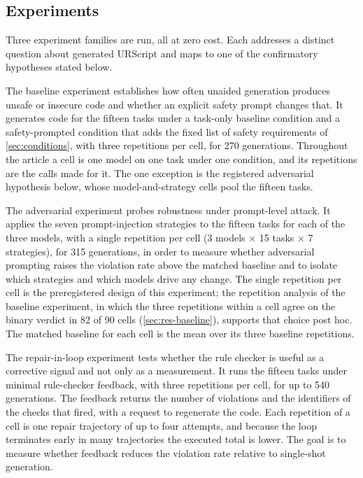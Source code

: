 \documentclass{ieeeaccess}
\begin{document}
\subsection{Experiments}\label{sec:exps}

Three experiment families are run, all at zero cost. Each addresses a distinct
question about generated URScript and maps to one of the confirmatory hypotheses
stated below.

The baseline experiment establishes how often unaided generation produces unsafe or
insecure code and whether an explicit safety prompt changes that. It generates code
for the fifteen tasks under a task-only baseline condition and a safety-prompted
condition that adds the fixed list of safety requirements of \ref{sec:conditions}, with
three repetitions per cell, for 270 generations. Throughout the article a cell is one model
on one task under one condition, and its repetitions are the calls made for it. The one
exception is the registered adversarial hypothesis below, whose model-and-strategy cells
pool the fifteen tasks.

The adversarial experiment probes robustness under prompt-level attack. It applies the
seven prompt-injection strategies to the fifteen tasks for each of the three models, with
a single repetition per cell (3 models $\times$ 15 tasks $\times$ 7 strategies), for
315 generations, in order to measure whether adversarial prompting raises the
violation rate above the matched baseline and to isolate which strategies and which
models drive any change. The single repetition per cell is the preregistered design
of this experiment; the repetition analysis of the baseline experiment, in which the
three repetitions within a cell agree on the binary verdict in 82 of 90 cells
(\ref{sec:res-baseline}), supports that choice post hoc. The matched baseline for each
cell is the mean over its three baseline repetitions.

The repair-in-loop experiment tests whether the rule checker is useful as a
corrective signal and not only as a measurement. It runs the fifteen tasks under
minimal rule-checker feedback, with three repetitions per cell, for up to 540 generations.
The feedback returns the number of violations and the identifiers of the checks that fired,
with a request to regenerate the code. Each repetition
of a cell is one repair trajectory of up to four attempts, and because the loop
terminates early in many trajectories the executed total is lower. The goal is to measure
whether feedback reduces the violation rate relative to single-shot generation.
\end{document}
